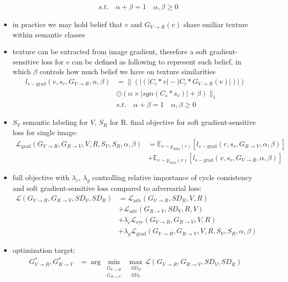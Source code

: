 \begin{itemize}
\begin{align}
		&s.t.\quad \alpha + \beta = 1 \quad \alpha, \beta \geq 0
	\end{align}
	\item in practice we may hold belief that $v$ and $G_{V\rightarrow R}(v)$ share smiliar texture within semantic classes
	\item texture can be extracted from image gradient, therefore a soft gradient-sensitive loss for $v$ can be defined as following to represent such belief, in which $\beta$ controls how much belief we have on texture similarities
	\begin{align}
		l_{s-\text{grad}}(v, s_v, G_{V\rightarrow R}, \alpha, \beta) &= \lVert(|(|C_i*v|-|C_i*G_{V\rightarrow R}(v)|)|)\\
		&\odot (\alpha \times |sgn(C_s*s_v)|+\beta)\rVert_1\\
		&s.t. \quad \alpha + \beta = 1 \quad \alpha, \beta \geq 0
	\end{align}
	\item $S_V$ semantic labeling for $V$, $S_R$ for R. final objective for soft gradient-sensitive loss for single image:
	\begin{align}
		\mathcal{L}_{\text{grad}}(G_{V\rightarrow R}, G_{R\rightarrow V}, V, R, S_V, S_R, \alpha, \beta) &= \mathbb{E}_{r\sim p_{\text{data}}(r)}[l_{s-\text{grad}}(r,s_r, G_{R\rightarrow V}, \alpha, \beta)]\\
		&+ \mathbb{E}_{v\sim p_{\text{data}}(v)}[l_{s-\text{grad}}(v,s_v, G_{V\rightarrow R}, \alpha, \beta)]
	\end{align}
	\item full objective with $\lambda_c$, $\lambda_g$ controlling relative importance of cycle consistency and soft gradient-sensitive loss compared to adversarial loss:
	\begin{align}
		\mathcal{L}(G_{V\rightarrow R}, G_{R\rightarrow V}, SD_V, SD_R) &= \mathcal{L}_{\text{adv}}(G_{V\rightarrow R}, SD_R, V, R)\\
		&+ \mathcal{L}_{\text{adv}}(G_{R\rightarrow V}, SD_V, R, V)\\
		&+ \lambda_c \mathcal{L}_{\text{cyc}}(G_{V\rightarrow R}, G_{R\rightarrow V}, V, R)\\
		&+ \lambda_g \mathcal{L}_{\text{grad}}(G_{V\rightarrow R}, G_{R\rightarrow V}, V, R, S_V, S_R, \alpha, \beta)
	\end{align}
	\item optimization target:
	\begin{align}
		G^*_{V\rightarrow R}, G^*_{R\rightarrow V} &= \arg \underset{\substack{G_{V\rightarrow R}\\ G_{R\rightarrow V}}}{\min}~ \underset{\substack{SD_R\\SD_V}}{\max}\mathcal{L}(G_{V\rightarrow R}, G_{R\rightarrow V}, SD_V, SD_R)
	\end{align}
\end{itemize}

